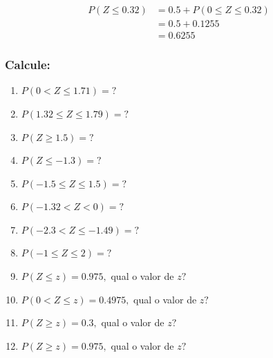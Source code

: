 \documentclass[14pt,aspectratio=1610]{beamer}
\begin{document}
\begin{frame}{}
\begin{minipage}{.3\linewidth}
    \begin{align*}
        P(Z\leq 0.32)&=0.5+P(0\leq Z\leq 0.32)\\
        &=0.5+0.1255\\
        &=0.6255
    \end{align*}
\end{minipage}%
\hspace{-2cm}
\begin{minipage}{0.1\linewidth}
    \centering
\end{minipage}
\end{frame}

\begin{frame}{}
\frametitle{Calcule:}
\begin{enumerate}
\item $P(0<Z\leq 1.71)=?$
\item $P(1.32\leq Z \leq 1.79)=?$
\item $P(Z\geq 1.5)=?$
\item $P(Z\leq -1.3)=?$
\item $P(-1.5\leq Z\leq 1.5)=?$
\item $P(-1.32 < Z <0)=?$
\item $P(-2.3<Z\leq -1.49)=?$
\item $P(-1\leq Z \leq 2)=?$
\item $P(Z\leq z)=0.975,$ qual o valor de $z?$
\item $P(0< Z \leq z)=0.4975,$ qual o valor de $z?$
\item $P(Z\geq z)=0.3,$ qual o valor de $z?$
\item $P(Z\geq z)=0.975,$ qual o valor de $z?$
\end{enumerate}
\end{frame}
\end{document}
